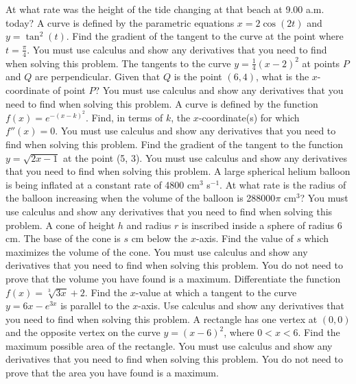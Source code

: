 \documentclass[12pt,addpoints]{exam}
\begin{document}
\begin{questions}
At what rate was the height of the tide changing at that beach at 9.00 a.m. today?
\fillwithlines{3cm}
\question[5] A curve is defined by the parametric equations \( x = 2\cos(2t) \) and \( y = \tan^2(t) \). Find the gradient of the tangent to the curve at the point where \( t = \frac{\pi}{4} \). You must use calculus and show any derivatives that you need to find when solving this problem.
\fillwithlines{3cm}
\question[5] The tangents to the curve \( y = \frac{1}{4}(x-2)^2 \) at points \( P \) and \( Q \) are perpendicular. Given that \( Q \) is the point \( (6, 4) \), what is the \( x \)-coordinate of point \( P \)? You must use calculus and show any derivatives that you need to find when solving this problem.
\fillwithlines{3cm}
\question[5] A curve is defined by the function \( f(x) = e^{-(x-k)^2} \). Find, in terms of \( k \), the \( x \)-coordinate(s) for which \( f''(x) = 0 \). You must use calculus and show any derivatives that you need to find when solving this problem.
\fillwithlines{3cm}
\question[5] Find the gradient of the tangent to the function \( y = \sqrt{2x - 1} \) at the point (5, 3). You must use calculus and show any derivatives that you need to find when solving this problem.
\fillwithlines{3cm}
\question[5] A large spherical helium balloon is being inflated at a constant rate of 4800 cm\(^3\) s\(^{-1}\). At what rate is the radius of the balloon increasing when the volume of the balloon is 288000\(\pi\) cm\(^3\)? You must use calculus and show any derivatives that you need to find when solving this problem.
\fillwithlines{3cm}
\question[5] A cone of height \( h \) and radius \( r \) is inscribed inside a sphere of radius 6 cm. The base of the cone is \( s \) cm below the \( x \)-axis. Find the value of \( s \) which maximizes the volume of the cone. You must use calculus and show any derivatives that you need to find when solving this problem. You do not need to prove that the volume you have found is a maximum.
\fillwithlines{3cm}
\question[5] Differentiate the function \( f(x) = \sqrt[3]{3x} + 2 \).
\fillwithlines{3cm}
\question[5] Find the \( x \)-value at which a tangent to the curve \( y = 6x - e^{3x} \) is parallel to the \( x \)-axis. Use calculus and show any derivatives that you need to find when solving this problem.
\fillwithlines{3cm}
\question[5] A rectangle has one vertex at \((0,0)\) and the opposite vertex on the curve \(y = (x - 6)^2\), where \(0 < x < 6\). Find the maximum possible area of the rectangle. You must use calculus and show any derivatives that you need to find when solving this problem. You do not need to prove that the area you have found is a maximum.

\end{questions}
\end{document}
